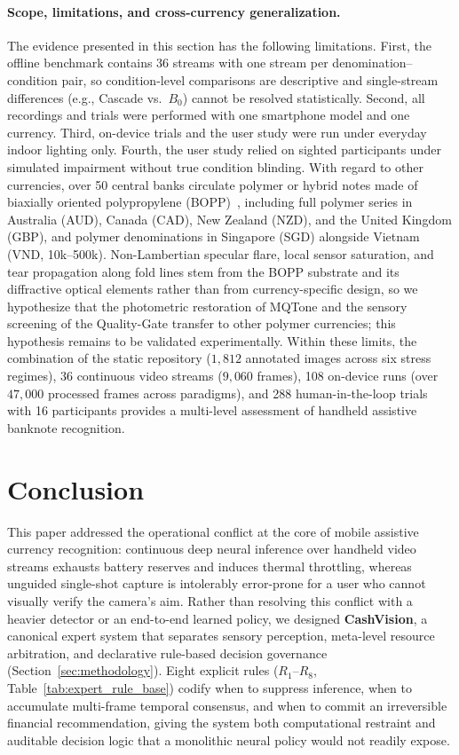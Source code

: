 \documentclass[final,5p,times,twocolumn,authoryear]{elsarticle}
\begin{document}
\paragraph{Scope, limitations, and cross-currency generalization.}
The evidence presented in this section has the following limitations. First, the offline benchmark contains 36 streams with one stream per denomination--condition pair, so condition-level comparisons are descriptive and single-stream differences (e.g., Cascade vs.\ $B_0$) cannot be resolved statistically. Second, all recordings and trials were performed with one smartphone model and one currency. Third, on-device trials and the user study were run under everyday indoor lighting only. Fourth, the user study relied on sighted participants under simulated impairment without true condition blinding. With regard to other currencies, over 50 central banks circulate polymer or hybrid notes made of biaxially oriented polypropylene (BOPP)~\cite{vanRenesse2005,deHeij2006}, including full polymer series in Australia (AUD), Canada (CAD), New Zealand (NZD), and the United Kingdom (GBP), and polymer denominations in Singapore (SGD) alongside Vietnam (VND, 10k--500k). Non-Lambertian specular flare, local sensor saturation, and tear propagation along fold lines stem from the BOPP substrate and its diffractive optical elements rather than from currency-specific design, so we hypothesize that the photometric restoration of MQTone and the sensory screening of the Quality-Gate transfer to other polymer currencies; this hypothesis remains to be validated experimentally. Within these limits, the combination of the static repository ($1{,}812$ annotated images across six stress regimes), 36 continuous video streams ($9{,}060$ frames), 108 on-device runs (over $47{,}000$ processed frames across paradigms), and 288 human-in-the-loop trials with 16 participants provides a multi-level assessment of handheld assistive banknote recognition.

\section{Conclusion}
\label{sec:conclusion}

This paper addressed the operational conflict at the core of mobile assistive currency recognition: continuous deep neural inference over handheld video streams exhausts battery reserves and induces thermal throttling, whereas unguided single-shot capture is intolerably error-prone for a user who cannot visually verify the camera's aim. Rather than resolving this conflict with a heavier detector or an end-to-end learned policy, we designed \textbf{CashVision}, a canonical expert system that separates sensory perception, meta-level resource arbitration, and declarative rule-based decision governance (Section~\ref{sec:methodology}). Eight explicit rules ($R_1$--$R_8$, Table~\ref{tab:expert_rule_base}) codify when to suppress inference, when to accumulate multi-frame temporal consensus, and when to commit an irreversible financial recommendation, giving the system both computational restraint and auditable decision logic that a monolithic neural policy would not readily expose.
\end{document}
